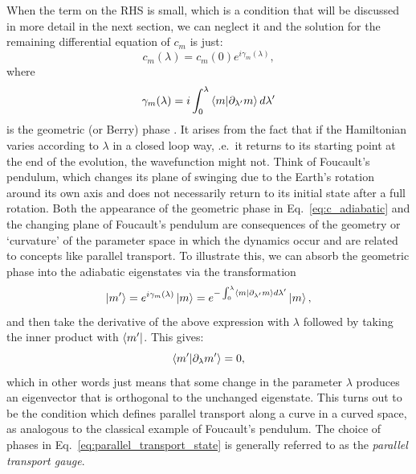 \documentclass[a4paper,oneside,11pt]{book}
\newcommand{\dlambda}{\partial_{\lambda}}
\begin{document}
    When the term on the RHS is small, which is a condition that will be discussed in more detail in the next section, we can neglect it and the solution for the remaining differential equation of $c_m$ is just:
    \begin{equation}\label{eq:c_adiabatic}
        c_m(\lambda) = c_m(0)e^{i \gamma_m(\lambda)},
    \end{equation}
    where
    \begin{equation}\label{eq:geometric_phase}
        \gamma_m(\lambda) = i \int_0^{\lambda} \braket{m}{\partial_{\lambda'} m} d \lambda' 
    \end{equation}
    is the geometric (or Berry) phase \cite{pancharatnam_generalized_1956, longuet-higgins_studies_1958, berry_quantal_1984}. It arises from the fact that if the Hamiltonian varies according to $\lambda$ in a closed loop way, \@i.e.~it returns to its starting point at the end of the evolution, the wavefunction might not. Think of Foucault's pendulum, which changes its plane of swinging due to the Earth's rotation around its own axis and does not necessarily return to its initial state after a full rotation. Both the appearance of the geometric phase in Eq.~\eqref{eq:c_adiabatic} and the changing plane of Foucault's pendulum are consequences of the geometry or `curvature' of the parameter space in which the dynamics occur and are related to concepts like parallel transport. To illustrate this, we can absorb the geometric phase into the adiabatic eigenstates via the transformation
    \begin{equation}\label{eq:parallel_transport_state}
        \ket{m'} = e^{i \gamma_m(\lambda)}\ket{m} = e^{- \int_0^{\lambda} \braket{m}{\partial_{\lambda'} m} d \lambda'}\ket{m},
    \end{equation}
    and then take the derivative of the above expression with $\lambda$ followed by taking the inner product with $\bra{m'}$. This gives:
    \begin{equation}\label{eq:geometric_phase_cancellation}
        \braket{m'}{\dlambda m'} = 0,
    \end{equation}
    which in other words just means that some change in the parameter $\lambda$ produces an eigenvector that is orthogonal to the unchanged eigenstate. This turns out to be the condition which defines parallel transport along a curve in a curved space, as analogous to the classical example of Foucault's pendulum. The choice of phases in Eq.~\eqref{eq:parallel_transport_state} is generally referred to as the \emph{parallel transport gauge}\cite{nakahara_geometry_2003}.
\end{document}
